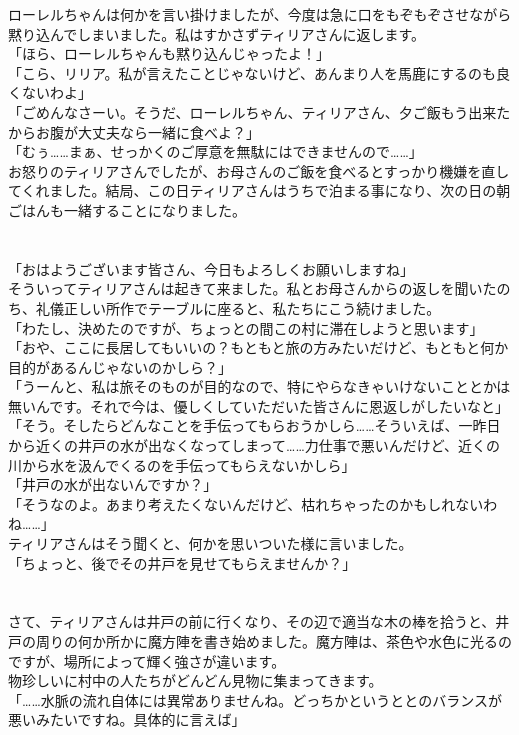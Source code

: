 \documentclass[oneside, a4paper]{jsbook}
\begin{document}
ローレルちゃんは何かを言い掛けましたが、今度は急に口をもぞもぞさせながら黙り込んでしまいました。私はすかさずティリアさんに返します。\\

\noindent
「ほら、ローレルちゃんも黙り込んじゃったよ！」\\
「こら、リリア。私が言えたことじゃないけど、あんまり人を馬鹿にするのも良くないわよ」\\
「ごめんなさーい。そうだ、ローレルちゃん、ティリアさん、夕ご飯もう出来たからお腹が大丈夫なら一緒に食べよ？」\\
「むぅ……まぁ、せっかくのご厚意を無駄にはできませんので……」\\

お怒りのティリアさんでしたが、お母さんのご飯を食べるとすっかり機嫌を直してくれました。結局、この日ティリアさんはうちで泊まる事になり、次の日の朝ごはんも一緒することになりました。\\\\\\

\noindent
「おはようございます皆さん、今日もよろしくお願いしますね」\\

そういってティリアさんは起きて来ました。私とお母さんからの返しを聞いたのち、礼儀正しい所作でテーブルに座ると、私たちにこう続けました。\\

\noindent
「わたし、決めたのですが、ちょっとの間この村に滞在しようと思います」\\
「おや、ここに長居してもいいの？もともと旅の方みたいだけど、もともと何か目的があるんじゃないのかしら？」\\
「うーんと、私は旅そのものが目的なので、特にやらなきゃいけないこととかは無いんです。それで今は、優しくしていただいた皆さんに恩返しがしたいなと」\\
「そう。そしたらどんなことを手伝ってもらおうかしら……そういえば、一昨日から近くの井戸の水が出なくなってしまって……力仕事で悪いんだけど、近くの川から水を汲んでくるのを手伝ってもらえないかしら」\\
「井戸の水が出ないんですか？」\\
「そうなのよ。あまり考えたくないんだけど、枯れちゃったのかもしれないわね……」\\

ティリアさんはそう聞くと、何かを思いついた様に言いました。\\

\noindent
「ちょっと、後でその井戸を見せてもらえませんか？」\\\\\\

さて、ティリアさんは井戸の前に行くなり、その辺で適当な木の棒を拾うと、井戸の周りの何か所かに魔方陣を書き始めました。魔方陣は、茶色や水色に光るのですが、場所によって輝く強さが違います。\\
物珍しいに村中の人たちがどんどん見物に集まってきます。\\

「……水脈の流れ自体には異常ありませんね。どっちかというととのバランスが悪いみたいですね。具体的に言えば」
\end{document}
